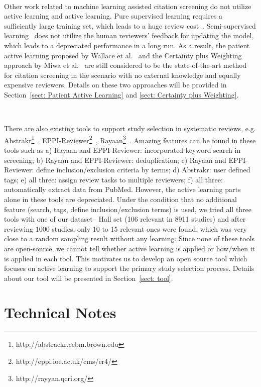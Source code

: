 \documentclass{svjour3}
\theoremstyle{break}
\newcommand{\respto}[1]{
\fcolorbox{black}{black!15}{
\label{response:#1}
\bf
  \scriptsize R-{#1}}~
}
\begin{document}
\respto{2c}
Other work related to machine learning assisted citation screening do not
utilize active learning and active learning. Pure supervised learning requires a sufficiently large training set, which leads to a huge review cost~\cite{cohen2006reducing,adeva2014automatic}. Semi-supervised learning~\cite{liu2016comparative} does not utilize the human reviewers' feedback for updating the model, which leads to a depreciated performance in a long run. As a result, the patient active
learning proposed by Wallace et al.~\cite{wallace2010semi} and the Certainty plus Weighting approach by Miwa et al.~\cite{miwa2014reducing} are still considered to be the state-of-the-art method for citation screening in the scenario with no external knowledge and equally expensive reviewers. Details on these two approaches will be provided in Section~\ref{sect: Patient Active Learning} and \ref{sect: Certainty plus Weighting}.

\respto{2g}
There are also existing tools to support study selection in systematic reviews, e.g. Abstrakr\footnote{http://abstrackr.cebm.brown.edu}~\cite{wallace2012deploying}, EPPI-Reviewer\footnote{http://eppi.ioe.ac.uk/cms/er4/}~\cite{thomas2010eppi}, Rayaan\footnote{http://rayyan.qcri.org/}~\cite{Ouzzani2016}. Amazing features can be found in these tools such as a) Rayaan and EPPI-Reviewer: incorporated keyword search in screening; b) Rayaan and EPPI-Reviewer: deduplication; c) Rayaan and EPPI-Reviewer: define inclusion/exclusion criteria by terms; d) Abstrakr: user defined tags; e) all three: assign review tasks to multiple reviewers; f) all three: automatically extract data from PubMed. However, the active learning parts alone in these tools are depreciated. Under the condition that no additional feature (search, tags, define inclusion/exclusion terms) is used, we tried all three tools with one of our dataset-- Hall set (106 relevant in 8911 studies) and after reviewing 1000 studies, only 10 to 15 relevant ones were found, which was very close to a random sampling result without any learning. Since none of these tools are open-source, we cannot tell whether active learning is applied or how/when it is applied in each tool. This motivates us to develop an open source tool which focuses on active learning to support the primary study selection process. Details about our tool will be presented in Section~\ref{sect: tool}.



\section{Technical Notes}
\label{sect: Technical Briefing}
\end{document}
